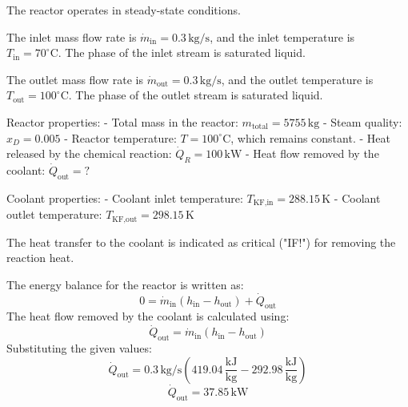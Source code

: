 The reactor operates in steady-state conditions.  

The inlet mass flow rate is \( \dot{m}_{\text{in}} = 0.3 \, \text{kg/s} \), and the inlet temperature is \( T_{\text{in}} = 70^\circ\text{C} \). The phase of the inlet stream is saturated liquid.  

The outlet mass flow rate is \( \dot{m}_{\text{out}} = 0.3 \, \text{kg/s} \), and the outlet temperature is \( T_{\text{out}} = 100^\circ\text{C} \). The phase of the outlet stream is saturated liquid.  

Reactor properties:  
- Total mass in the reactor: \( m_{\text{total}} = 5755 \, \text{kg} \)  
- Steam quality: \( x_D = 0.005 \)  
- Reactor temperature: \( T = 100^\circ\text{C} \), which remains constant.  
- Heat released by the chemical reaction: \( \dot{Q}_R = 100 \, \text{kW} \)  
- Heat flow removed by the coolant: \( \dot{Q}_{\text{out}} = ? \)  

Coolant properties:  
- Coolant inlet temperature: \( T_{\text{KF,in}} = 288.15 \, \text{K} \)  
- Coolant outlet temperature: \( T_{\text{KF,out}} = 298.15 \, \text{K} \)  

The heat transfer to the coolant is indicated as critical ("IF!") for removing the reaction heat.

The energy balance for the reactor is written as:  
\[
0 = \dot{m}_{\text{in}} (h_{\text{in}} - h_{\text{out}}) + \dot{Q}_{\text{out}}
\]  
The heat flow removed by the coolant is calculated using:  
\[
\dot{Q}_{\text{out}} = \dot{m}_{\text{in}} (h_{\text{in}} - h_{\text{out}})
\]  
Substituting the given values:  
\[
\dot{Q}_{\text{out}} = 0.3 \, \text{kg/s} \left(419.04 \, \frac{\text{kJ}}{\text{kg}} - 292.98 \, \frac{\text{kJ}}{\text{kg}}\right)
\]  
\[
\dot{Q}_{\text{out}} = 37.85 \, \text{kW}
\]